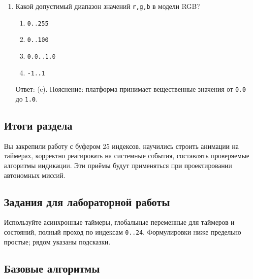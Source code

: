 \begin{enumerate}
  \item Какой допустимый диапазон значений \verb|r,g,b| в модели RGB?
  \begin{enumerate}[label=(\alph*)]
    \item \verb|0..255| \item \verb|0..100| \item \verb|0.0..1.0| \item \verb|-1..1|
  \end{enumerate}
  Ответ: (c). Пояснение: платформа принимает вещественные значения от \verb|0.0| до \verb|1.0|.
\end{enumerate}
\subsection*{Итоги раздела}
Вы закрепили работу с буфером 25 индексов, научились строить анимации на таймерах, корректно реагировать на системные события, составлять проверяемые алгоритмы индикации. Эти приёмы будут применяться при проектировании автономных миссий.

\subsection{Задания для лабораторной работы}
Используйте асинхронные таймеры, глобальные переменные для таймеров и состояний, полный проход по индексам \verb|0..24|. Формулировки ниже предельно простые; рядом указаны подсказки.
\subsection{Базовые алгоритмы}

